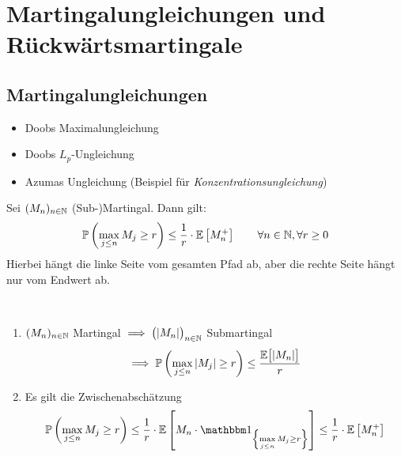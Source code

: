
\chapter{Martingalungleichungen und Rückwärtsmartingale} %
\section{Martingalungleichungen} %
\begin{itemize}
\item Doobs Maximalungleichung
\item Doobs $L_p$-Ungleichung
\item Azumas Ungleichung (Beispiel für \textit{Konzentrationsungleichung})
\end{itemize}

\setcounter{section}{5} %
\begin{theorem}\label{theorem5.1DoobMaximalungleichung}\enter
Sei $(M_n)_{n\in\mathbb{N}}$ (Sub-)Martingal. Dann gilt:
\begin{align*}
\mathbb{P}\left(\max\limits_{j\leq n} M_j\geq r\right)\leq\frac{1}{r}\cdot\mathbb{E}\left[M_n^+\right]\qquad\forall n\in\mathbb{N},\forall r\geq0
\end{align*}
Hierbei hängt die linke Seite vom gesamten Pfad ab, aber die rechte Seite hängt nur vom Endwert ab.
\end{theorem}
\begin{bemerkung}\
\begin{enumerate}[label=(\alph*)]
\item $(M_n)_{n\in\mathbb{N}}$ Martingal $\implies\big(|M_n|\big)_{n\in\mathbb{N}}$ Submartingal
\begin{align*}
\implies\mathbb{P}\left(\max\limits_{j\leq n} |M_j|\geq r\right)\leq\frac{\mathbb{E}\big[|M_n|\big]}{r}
\end{align*}
\item Es gilt die Zwischenabschätzung
\begin{align*}
\P\left(\max\limits_{j\leq n} M_j\geq r\right)
\leq
\frac{1}{r}\cdot\E\left[M_n\cdot\indi_{\left\lbrace\max\limits_{j\leq n} M_j\geq r\right\rbrace}\right]
\leq
\frac{1}{r}\cdot\E\left[M_n^+\right]
\end{align*}
\end{enumerate}
\end{bemerkung}

